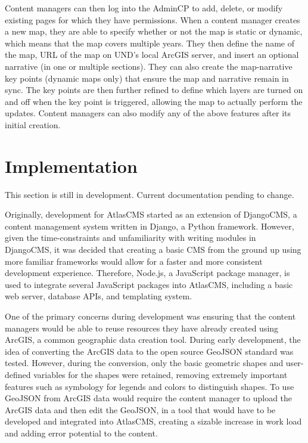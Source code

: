 \documentclass[11pt, final, conference, twocolumn]{IEEEtran}
\begin{document}
Content managers can then log into the AdminCP to add, delete, or modify existing pages for which they have permissions. When a content manager creates a new map, they are able to specify whether or not the map is static or dynamic, which means that the map covers multiple years. They then define the name of the map, URL of the map on UND's local ArcGIS server, and insert an optional narrative (in one or multiple sections). They can also create the map-narrative key points (dynamic maps only) that ensure the map and narrative remain in sync. The key points are then further refined to define which layers are turned on and off when the key point is triggered, allowing the map to actually perform the updates. Content managers can also modify any of the above features after its initial creation.

\section{Implementation}
This section is still in development. Current documentation pending to change.

Originally, development for AtlasCMS started as an extension of DjangoCMS, a content management system written in Django, a Python framework. However, given the time-constraints and unfamiliarity with writing modules in DjangoCMS, it was decided that creating a basic CMS from the ground up using more familiar frameworks would allow for a faster and more consistent development experience. Therefore, Node.js, a JavaScript package manager, is used to integrate several JavaScript packages into AtlasCMS, including a basic web server, database APIs, and templating system.

One of the primary concerns during development was ensuring that the content managers would be able to reuse resources they have already created using ArcGIS, a common geographic data creation tool. During early development, the idea of converting the ArcGIS data to the open source GeoJSON standard was tested. However, during the conversion, only the basic geometric shapes and user-defined variables for the shapes were retained, removing extremely important features such as symbology for legends and colors to distinguish shapes. To use GeoJSON from ArcGIS data would require the content manager to upload the ArcGIS data and then edit the GeoJSON, in a tool that would have to be developed and integrated into AtlasCMS, creating a sizable increase in work load and adding error potential to the content.
\end{document}
